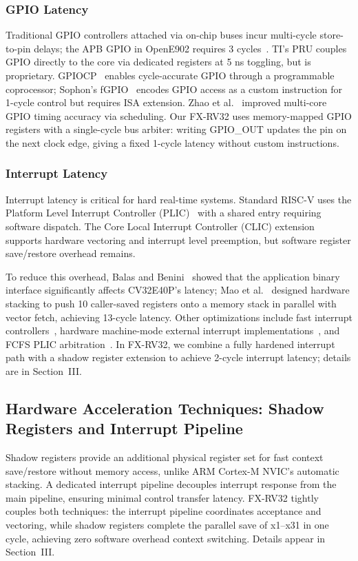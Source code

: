 \documentclass[letterpaper,journal]{IEEEtran}
\begin{document}
\subsubsection{GPIO Latency}
Traditional GPIO controllers attached via on-chip buses incur multi-cycle store-to-pin delays; the APB GPIO in OpenE902 requires 3 cycles~\cite{ref30}.
TI's PRU couples GPIO directly to the core via dedicated registers at 5 ns toggling, but is proprietary.
GPIOCP~\cite{ref10} enables cycle-accurate GPIO through a programmable coprocessor; Sophon's fGPIO~\cite{ref1} encodes GPIO access as a custom instruction for 1-cycle control but requires ISA extension.
Zhao et al.~\cite{ref11} improved multi-core GPIO timing accuracy via scheduling.
Our FX-RV32 uses memory-mapped GPIO registers with a single-cycle bus arbiter: writing GPIO\_OUT updates the pin on the next clock edge, giving a fixed 1-cycle latency without custom instructions.

\subsubsection{Interrupt Latency}
Interrupt latency is critical for hard real-time systems.
Standard RISC-V uses the Platform Level Interrupt Controller (PLIC)~\cite{ref17} with a shared entry requiring software dispatch.
The Core Local Interrupt Controller (CLIC) extension~\cite{ref18} supports hardware vectoring and interrupt level preemption, but software register save/restore overhead remains.

To reduce this overhead, Balas and Benini~\cite{ref6} showed that the application binary interface significantly affects CV32E40P's latency; Mao et al.~\cite{ref5} designed hardware stacking to push 10 caller-saved registers onto a memory stack in parallel with vector fetch, achieving 13-cycle latency.
Other optimizations include fast interrupt controllers~\cite{ref26}, hardware machine-mode external interrupt implementations~\cite{ref27}, and FCFS PLIC arbitration~\cite{ref28}.
In FX-RV32, we combine a fully hardened interrupt path with a shadow register extension to achieve 2-cycle interrupt latency; details are in Section~III.

\subsection{Hardware Acceleration Techniques: Shadow Registers and Interrupt Pipeline}
Shadow registers provide an additional physical register set for fast context save/restore without memory access, unlike ARM Cortex-M NVIC's automatic stacking.
A dedicated interrupt pipeline decouples interrupt response from the main pipeline, ensuring minimal control transfer latency.
FX-RV32 tightly couples both techniques: the interrupt pipeline coordinates acceptance and vectoring, while shadow registers complete the parallel save of x1--x31 in one cycle, achieving zero software overhead context switching.
Details appear in Section~III.
\end{document}
